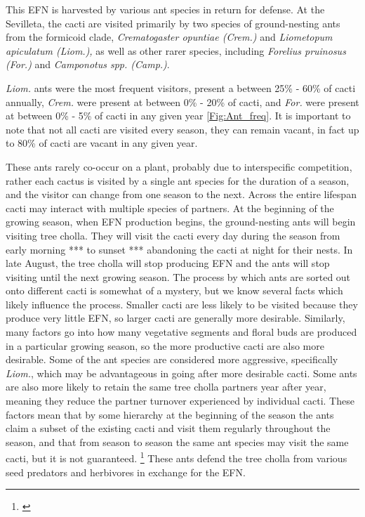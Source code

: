 \documentclass[12pt,a4paper]{article}
\newcommand{\ali}[2]{{\color{pink}{#1}}\footnote{\textit{\color{pink}{#2}}}}
\begin{document}
This EFN is harvested by various ant species in return for defense. 
At the Sevilleta, the cacti are visited primarily by two species of ground-nesting ants from the formicoid clade, \textit{Crematogaster opuntiae (Crem.) } and \textit{Liometopum apiculatum (Liom.), } as well as other rarer species, including \textit{Forelius pruinosus (For.) } and \textit{Camponotus spp. (Camp.)}.

\textit{Liom.} ants were the most frequent visitors, present a  between 25\% - 60\% of cacti annually, \textit{Crem.} were present at between 0\% - 20\% of cacti, and \textit{For.} were present at between 0\% - 5\% of cacti in any given year \ref{Fig:Ant_freq}. 
It is important to note that not all cacti are visited every season, they can remain vacant, in fact up to 80\% of cacti are vacant in any given year. 

These ants rarely co-occur on a plant, probably due to interspecific competition\cite{Miller2007}, rather each cactus is visited by a single ant species for the duration of a season, and the visitor can change from one season to the next. 
Across the entire lifespan cacti may interact with multiple species of partners. 
At the beginning of the growing season, when EFN production begins, the ground-nesting ants will begin visiting tree cholla.
They will visit the cacti every day during the season from early morning *** to sunset *** abandoning the cacti at night for their nests. 
In late August, the tree cholla will stop producing EFN and the ants will stop visiting until the next growing season. 
The process by which ants are sorted out onto different cacti is somewhat of a mystery, but we know several facts which likely influence the process. 
Smaller cacti are less likely to be visited because they produce very little EFN, so larger cacti are generally more desirable\cite{Miller2014}. 
Similarly, many factors go into how many vegetative segments and floral buds are produced in a particular growing season, so the more productive cacti are also more desirable. 
Some of the ant species are considered more aggressive, specifically \textit{Liom.}\cite{Miller2007}, which may be advantageous in going after more desirable cacti. 
Some ants are also more likely to retain the same tree cholla partners year after year, meaning they reduce the partner turnover experienced by individual cacti. 
These factors mean that by some hierarchy at the beginning of the season the ants claim a subset of the existing cacti and visit them regularly throughout the season, and that from season to season the same ant species may visit the same cacti, but it is not guaranteed. 
\ali{Note.}{I am not sure how much of this I should include here, since some of the turnover info is results from this paper?}
These ants defend the tree cholla from various seed predators and herbivores in exchange for the EFN. 
\end{document}
